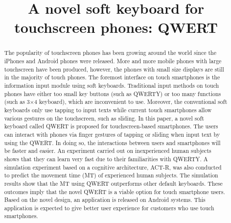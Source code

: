 \documentclass{singlecol-new}
\theoremstyle{TH}{
\newtheorem{lemma}{Lemma}
\newtheorem{theorem}[lemma]{Theorem}
\newtheorem{corrolary}[lemma]{Corrolary}
\newtheorem{conjecture}[lemma]{Conjecture}
\newtheorem{proposition}[lemma]{Proposition}
\newtheorem{claim}[lemma]{Claim}
\newtheorem{stheorem}[lemma]{Wrong Theorem}
\newtheorem{algorithm}{Algorithm}
}
\theoremstyle{THrm}{
\newtheorem{definition}{Definition}[section]
\newtheorem{question}{Question}[section]
\newtheorem{remark}{Remark}
\newtheorem{scheme}{Scheme}
}
\theoremstyle{THhit}{
\newtheorem{case}{Case}[section]
}
\begin{document}
\setcounter{page}{1}






\BottomCatch



\subtitle{}

\title{A novel soft keyboard for touchscreen phones: QWERT}



\begin{abstract}
The popularity of touchscreen phones has been growing around the world since the iPhones and Android phones were released. More and more mobile phones with large touchscreen have been produced, however, the phones with small size displays are still in the majority of touch phones. The foremost interface on touch smartphones is the information input module using soft keyboards. Traditional input methods on touch phones have either too small key buttons (such as QWERTY) or too many functions (such as 3$\times$4 keyboard), which are inconvenient to use. Moreover, the conventional soft keyboards only use tapping to input texts while current touch smartphones allow various gestures on the touchscreen, such as sliding. In this paper, a novel soft keyboard called QWERT is proposed for touchscreen-based smartphones. The users can interact with phones via finger gestures of tapping or sliding when input text by using the QWERT. In doing so, the interactions between users and smartphones will be faster and easier. An experiment carried out on inexperienced human subjects shows that they can learn very fast due to their familiarities with QWERTY. A simulation experiment based on a cognitive architecture, ACT-R, was also conducted to predict the movement time (MT) of experienced human subjects. The simulation results show that the MT using QWERT outperforms other default keyboards. These outcomes imply that the novel QWERT is a viable option for touch smartphone users. Based on the novel design, an application is released on Android systems. This application is expected to give better user experience for customers who use touch smartphones.
\end{abstract}
\end{document}
